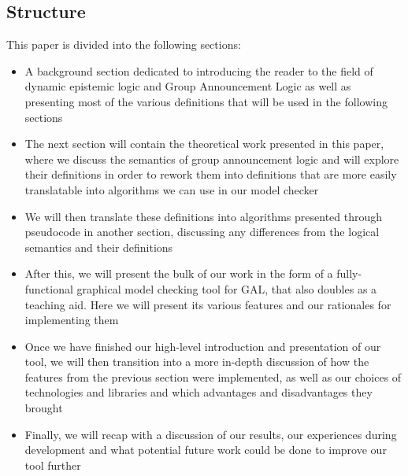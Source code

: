 


\subsection{Structure}

This paper is divided into the following sections: 

\begin{itemize}
	\item{A background section dedicated to introducing the reader to the field of dynamic epistemic logic and Group Announcement Logic as well as presenting most of the various definitions that will be used in the following sections}
	\item{The next section will contain the theoretical work presented in this paper, where we discuss the semantics of group announcement logic and will explore their definitions in order to rework them into definitions that are more easily translatable into algorithms we can use in our model checker}
	\item{We will then translate these definitions into algorithms presented through pseudocode in another section, discussing any differences from the logical semantics and their definitions}
	\item{After this, we will present the bulk of our work in the form of a fully-functional graphical model checking tool for GAL, that also doubles as a teaching aid. Here we will present its various features and our rationales for implementing them}
	\item{Once we have finished our high-level introduction and presentation of our tool, we will then transition into a more in-depth discussion of how the features from the previous section were implemented, as well as our choices of technologies and libraries and which advantages and disadvantages they brought}
	\item{Finally, we will recap with a discussion of our results, our experiences during development and what potential future work could be done to improve our tool further}
\end{itemize}

